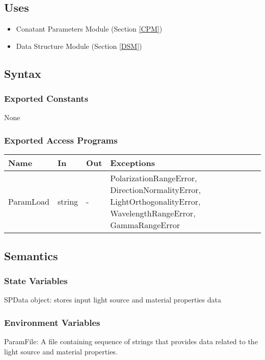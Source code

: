 \documentclass[12pt, titlepage]{article}
\begin{document}
	\subsection{Uses} \begin{itemize} \item Conatant Parameters Module (Section
		\ref{CPM}) \item Data Structure Module (Section \ref{DSM})
		
	\end{itemize}
	
	\subsection{Syntax}
	
	\subsubsection{Exported Constants} None
	
	\subsubsection{Exported Access Programs}
	
	\begin{center} \begin{tabular}{p{3cm} p{2cm} p{2cm} p{8cm}} \hline
			\textbf{Name} & \textbf{In} & \textbf{Out} & \textbf{Exceptions} \\ \hline
			ParamLoad & string & - & PolarizationRangeError, DirectionNormalityError,
			LightOrthogonalityError,  WavelengthRangeError, GammaRangeError\\
			
			\hline \end{tabular} \end{center}
	
	\subsection{Semantics}
	
	\subsubsection{State Variables}
	
	SPData object: stores input light source and material properties data
	
	\subsubsection{Environment Variables} ParamFile: A file containing sequence of
	strings that provides data related to the light source and material properties.
	
\end{document}
